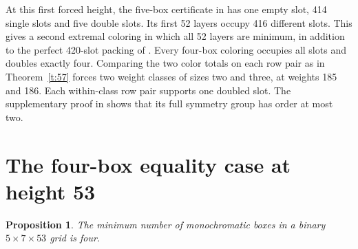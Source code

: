 \documentclass[11pt]{article}
\newtheorem{proposition}[theorem]{Proposition}
\begin{document}
At this first forced height, the five-box certificate in \cite{data} has one empty slot, 414 single slots and five double slots. Its first 52 layers occupy 416 different slots. This gives a second extremal coloring in which all 52 layers are minimum, in addition to the perfect 420-slot packing of \cite{data}. Every four-box coloring occupies all slots and doubles exactly four. Comparing the two color totals on each row pair as in Theorem~\ref{t:57} forces two weight classes of sizes two and three, at weights 185 and 186. Each within-class row pair supports one doubled slot. The supplementary proof in \cite{data} shows that its full symmetry group has order at most two.

\section{The four-box equality case at height 53}
\label{s:53}
\begin{proposition}\label{p:53}
The minimum number of monochromatic boxes in a binary $5\times7\times53$ grid is four.
\end{proposition}
\end{document}
